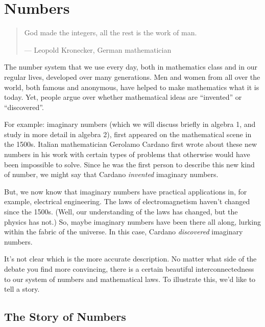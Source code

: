 \chapter{Numbers}
\label{ch:numbers}

\begin{quote}
God made the integers, all the rest is the work of man.
\par\hfill --- Leopold Kronecker, German mathematician
\end{quote}
\bigskip

The number system that we use every day, both in mathematics class and in our regular lives, developed over many generations. Men and women from all over the world, both famous and anonymous, have helped to make mathematics what it is today. Yet, people argue over whether mathematical ideas are ``invented'' or ``discovered''.

For example: \glspl{imaginary number} (which we will discuss briefly in algebra 1, and study in more detail in algebra 2), first appeared on the mathematical scene in the 1500s. Italian mathematician Gerolamo Cardano first wrote about these new numbers in his work with certain types of problems that otherwise would have been impossible to solve. Since he was the first person to describe this new kind of number, we might say that Cardano \textit{invented} imaginary numbers.

But, we now know that imaginary numbers have practical applications in, for example, electrical engineering. The laws of electromagnetism haven't changed since the 1500s. (Well, our understanding of the laws has changed, but the physics has not.) So, maybe imaginary numbers have been there all along, lurking within the fabric of the universe. In this case, Cardano \textit{discovered} imaginary numbers.

It's not clear which is the more accurate description. No matter what side of the debate you find more convincing, there is a certain beautiful interconnectedness to our system of numbers and mathematical laws. To illustrate this, we'd like to tell a story.

\section{The Story of Numbers}
\label{sec:storyofnumbers}

